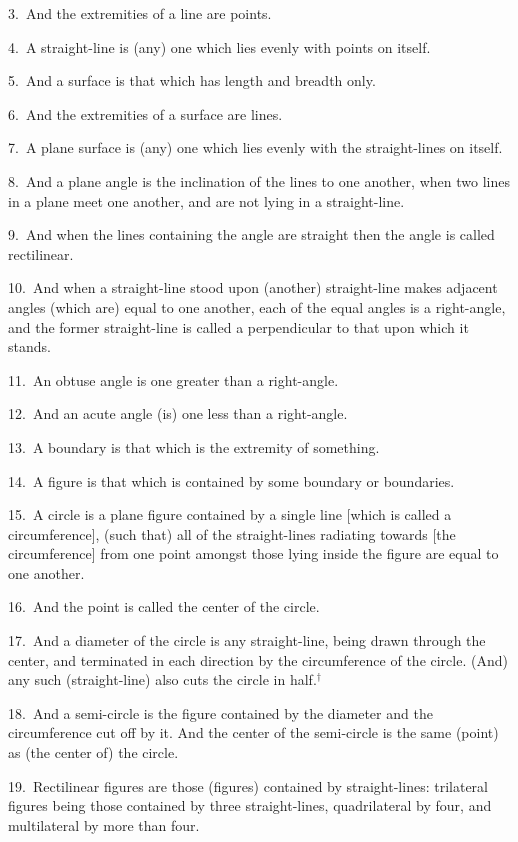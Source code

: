 \begin{Parallel}{}{}
{3.~And the extremities of a line are points.

4.~A straight-line is (any) one which lies  evenly with points on itself.

5.~And a surface is that which has length and breadth only.

6.~And the extremities of a surface are lines.

7.~A plane surface is (any) one which lies evenly with the straight-lines on itself.

8.~And a plane angle is the inclination of the lines to one another, when two lines in a plane 
meet one another, and are not lying in a straight-line.

9.~And when the lines containing the angle are straight then the angle is called rectilinear.

10.~And when a straight-line stood upon (another) straight-line makes adjacent angles (which are) equal to one another, each of the equal angles is a
right-angle, and the former straight-line  is called a perpendicular to that upon which it stands.

11.~An obtuse angle is one greater than a right-angle.

12.~And an acute angle (is) one less than a right-angle.

13.~A boundary is that which is the extremity of something.

14.~A figure is that which is contained by some boundary or boundaries.

15.~A circle is a plane figure  contained by a single line [which is called a circumference], (such that) all of the straight-lines  radiating towards
 [the circumference] from one
point amongst those lying inside the figure  are equal to one another.

16.~And the point is called the center of the circle.

17.~And a diameter of the circle is any straight-line, being drawn through the
center, and terminated in each direction by the circumference of the circle. (And) any such (straight-line) also cuts the circle in half.$^\dag$

18.~And a semi-circle is the figure contained by the diameter  and
the circumference  cut off by it. And the center of the semi-circle is the same (point)
as (the center of) the circle.

19.~Rectilinear figures are those (figures) contained by straight-lines: trilateral
figures being those contained by three straight-lines,  quadrilateral   by four,
and multilateral by more than four.

}
\end{Parallel}
